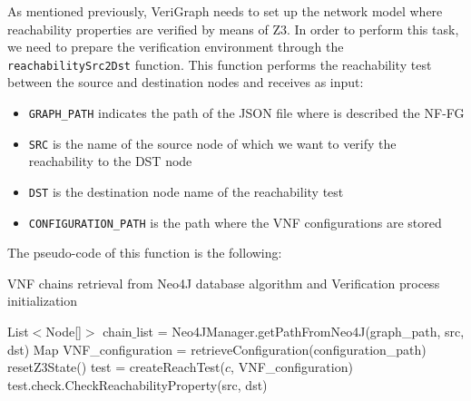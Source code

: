 As mentioned previously, VeriGraph needs to set up the network model where reachability properties are verified by means of Z3. In order to perform this task, we need to prepare the verification environment through the \texttt{reachabilitySrc2Dst} function. This function performs the reachability test between the source and destination nodes and receives as input:
\begin{itemize}
	\item \texttt{GRAPH\_PATH} indicates the path of the JSON file where is described the NF-FG
	\item \texttt{SRC} is the name of the source node of which we want to verify the reachability to the DST node
	\item \texttt{DST} is the destination node name of the reachability test
	\item \texttt{CONFIGURATION\_PATH} is the path where the VNF configurations are stored
\end{itemize}
The pseudo-code of this function is the following:
\begin{algorithm}
	\label{alg1}
	\caption{VNF chains retrieval from Neo4J database algorithm and Verification process initialization}
	\begin{algorithmic}[1]
		 {}
		\State List$<$Node[]$>$ chain$\_$list = Neo4JManager.getPathFromNeo4J(graph\_path, src, dst)
		\State Map VNF\_configuration = retrieveConfiguration(configuration\_path)
		\State resetZ3State()
		\State test = createReachTest($c$, VNF\_configuration)
		\State test.check.CheckReachabilityProperty(src, dst)
		\EndFor
		\EndProcedure
	\end{algorithmic}
\end{algorithm}

